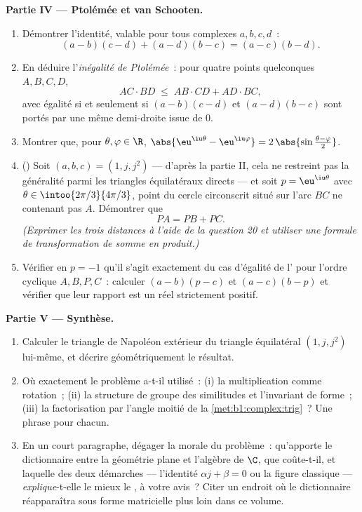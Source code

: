 \begin{problem}
\medskip
\noindent\textbf{Partie IV --- Ptolémée et van Schooten.}
\begin{enumerate}[resume]
  \item Démontrer l'identité, valable pour tous complexes $a, b, c,
        d$~:
        \[
        (a - b)(c - d) + (a - d)(b - c) = (a - c)(b - d) .
        \]
  \item En déduire l'\emph{inégalité de
        Ptolémée}~: pour quatre points
        quelconques $A, B, C, D$,
        \[
        AC \cdot BD \;\leq\; AB \cdot CD + AD \cdot BC ,
        \]
        avec égalité si et seulement si $(a-b)(c-d)$ et
        $(a-d)(b-c)$ sont portés par une même demi-droite issue de
        $0$.
  \item Montrer que, pour $\theta, \varphi \in \R$,
        $\abs{\eu^{\iu\theta} - \eu^{\iu\varphi}} =
        2\,\abs{\sin\frac{\theta - \varphi}2}$.
  \item ()
        Soit $(a, b, c) = (1, j, j^2)$ --- d'après la partie II,
        cela ne restreint pas la généralité parmi les triangles
        équilatéraux directs --- et soit $p = \eu^{\iu\theta}$ avec
        $\theta \in \intoo{2\pi/3}{4\pi/3}$, point du cercle
        circonscrit situé sur l'arc $BC$ ne contenant pas $A$.
        Démontrer que
        \[
        PA = PB + PC .
        \]
        \emph{(Exprimer les trois distances à l'aide de la question
        20 et utiliser une formule de transformation de somme en
        produit.)}
  \item Vérifier en $p = -1$ qu'il s'agit exactement du cas
        d'égalité de l' pour l'ordre cyclique
        $A, B, P, C$~: calculer $(a - b)(p - c)$ et $(a - c)(b - p)$
        et vérifier que leur rapport est un réel strictement
        positif.
\end{enumerate}

\medskip
\noindent\textbf{Partie V --- Synthèse.}
\begin{enumerate}[resume]
  \item Calculer le triangle de Napoléon extérieur du triangle
        équilatéral $(1, j, j^2)$ lui-même, et décrire
        géométriquement le résultat.
  \item Où exactement le problème a-t-il utilisé~: (i) la
        multiplication comme rotation~; (ii) la structure de groupe
        des similitudes et l'invariant de forme~; (iii) la
        factorisation par l'angle moitié de la
        \cref{met:b1:complex:trig}~? Une phrase pour chacun.
  \item En un court paragraphe, dégager la morale du problème~:
        qu'apporte le dictionnaire entre la géométrie plane et
        l'algèbre de $\C$, que coûte-t-il, et laquelle des deux
        démarches --- l'identité $\alpha j + \beta = 0$ ou la figure
        classique --- \emph{explique}-t-elle le mieux le , à votre avis~? Citer un endroit où le dictionnaire
        réapparaîtra sous forme matricielle plus loin dans ce
        volume.
\end{enumerate}
\end{problem}
